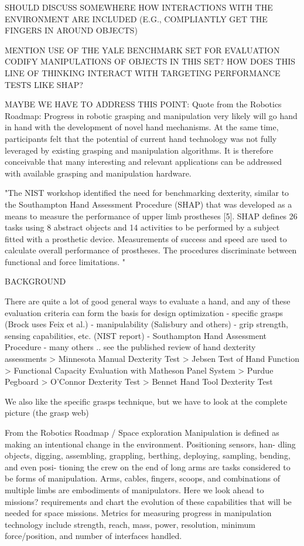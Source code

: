 SHOULD DISCUSS SOMEWHERE HOW INTERACTIONS WITH THE ENVIRONMENT ARE INCLUDED (E.G., COMPLIANTLY GET THE FINGERS IN AROUND OBJECTS)

MENTION USE OF THE YALE BENCHMARK SET FOR EVALUATION
	CODIFY MANIPULATIONS OF OBJECTS IN THIS SET?
	HOW DOES THIS LINE OF THINKING INTERACT WITH TARGETING PERFORMANCE TESTS LIKE SHAP?
	
MAYBE WE HAVE TO ADDRESS THIS POINT:
Quote from the Robotics Roadmap:
Progress in robotic grasping and manipulation very likely will go hand in hand with the development of novel hand mechanisms. At the same time, participants felt that the potential of current hand technology was not fully leveraged by existing grasping and manipulation algorithms. It is therefore conceivable that many interesting and relevant applications can be addressed with available grasping and manipulation hardware.	



"The NIST
workshop identified the need for benchmarking dexterity, similar to the Southampton Hand 
Assessment Procedure (SHAP) that was developed as a means to measure the performance of upper limb 
prostheses [5].  SHAP defines 26 tasks using 8 abstract objects and
14 activities to be performed by a subject 
fitted with a prosthetic device.  Measurements of success and speed are used to calculate overall performance of 
prostheses.  The procedures discriminate between functional and force limitations. "


BACKGROUND

There are quite a lot of good general ways to evaluate a hand, and any of these evaluation criteria can form the basis for design optimization
	- specific grasps (Brock uses Feix et al.)
	- manipulability (Salisbury and others)
	- grip strength, sensing capabilities, etc.   (NIST report)
	- Southampton Hand Assessment Procedure
	- many others .. see the published review of hand dexterity assessments
		> Minnesota Manual Dexterity Test
		> Jebsen Test of Hand Function
		> Functional Capacity Evaluation with Matheson Panel System
		> Purdue Pegboard
		> O'Connor Dexterity Test
		> Bennet Hand Tool Dexterity Test
	
We also like the specific grasps technique, but we have to look at the complete picture (the grasp web)



From the Robotics Roadmap / Space exploration
Manipulation is defined as making an intentional change in the environment. Positioning sensors, han- dling objects, digging, assembling, grappling, berthing, deploying, sampling, bending, and even posi- tioning the crew on the end of long arms are tasks considered to be forms of manipulation. Arms, cables, fingers, scoops, and combinations of multiple limbs are embodiments of manipulators. Here we look ahead to missions? requirements and chart the evolution of these capabilities that will be needed for space missions. Metrics for measuring progress in manipulation technology include strength, reach, mass, power, resolution, minimum force/position, and number of interfaces handled.


